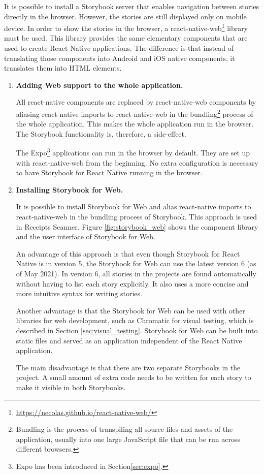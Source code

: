 \documentclass[
  digital, %
  table,   %
  oneside, %
  lof,     %
  lot,     %
]{fithesis3}
\begin{document}
It is possible to install a Storybook server that enables navigation between stories directly in the browser. However, the stories are still displayed only on mobile device. In order to show the stories in the browser, a react-native-web\footnote{\url{https://necolas.github.io/react-native-web/}} library must be used. This library provides the same elementary components that are used to create React Native applications. The difference is that instead of translating those components into Android and iOS native components, it translates them into HTML elements.

\begin{enumerate}
    \item \textbf{Adding Web support to the whole application.}
    
    All react-native components are replaced by react-native-web components by aliasing react-native imports to react-native-web in the bundling\footnote{Bundling is the process of transpiling all source files and assets of the application, usually into one large JavaScript file that can be run across different browsers.} process of the whole application. This makes the whole application run in the browser. The Storybook functionality is, therefore, a side-effect.
    
    The Expo\footnote{Expo has been introduced in Section\ref{sec:expo}.} applications can run in the browser by default. They are set up with react-native-web from the beginning. No extra configuration is necessary to have Storybook for React Native running in the browser.
    
    \item \textbf{Installing Storybook for Web.} 
    
    It is possible to install Storybook for Web and alias react-native imports to react-native-web in the bundling process of Storybook. This approach is used in Receipts Scanner. Figure \ref{fig:storybook_web} shows the component library and the user interface of Storybook for Web.
    
    An advantage of this approach is that even though Storybook for React Native is in version 5, the Storybook for Web can use the latest version 6 (as of May 2021). In version 6, all stories in the projects are found automatically without having to list each story explicitly. It also uses a more concise and more intuitive syntax for writing stories.
    
    Another advantage is that the Storybook for Web can be used with other libraries for web development, such as Chromatic for visual testing, which is described in Section \ref{sec:visual_testing}. Storybook for Web can be built into static files and served as an application independent of the React Native application.
    
    The main disadvantage is that there are two separate Storybooks in the project. A small amount of extra code needs to be written for each story to make it visible in both Storybooks. 
    
\end{enumerate}
\end{document}
